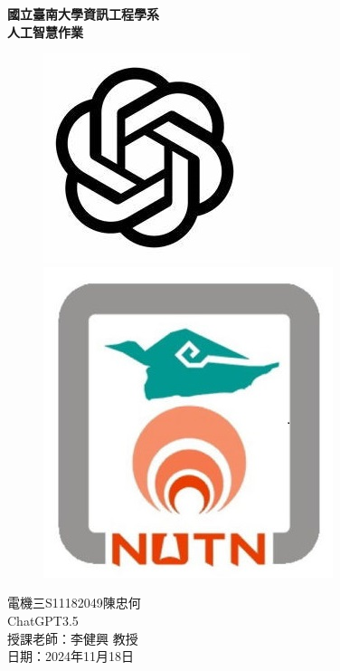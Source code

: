 \setmainfont{Times New Roman}  %
\begin{titlepage}
    \centering
    {\Huge \textbf{國立臺南大學資訊工程學系\\人工智慧作業}}\\[2cm] %
    \begin{figure}[htbp]
        \centering
        \includegraphics[width=0.3\linewidth]{images/chatgpt.jpg} 
        \hspace{2cm}
        \includegraphics[width=0.3\linewidth]{images/NUTN_LOGO.jpg}
    \end{figure} 
    \vspace{2cm}
    {\Large 電機三\hspace{1em}S11182049\hspace{1em}陳忠何}\\[0.5cm] 
    {\Large ChatGPT3.5}\\[0.5cm]
    \vfill
    {\Large 授課老師：李健興 教授}\\[1cm] %
    {\Large 日期：2024年11月18日}\\[2cm] %
\end{titlepage} 